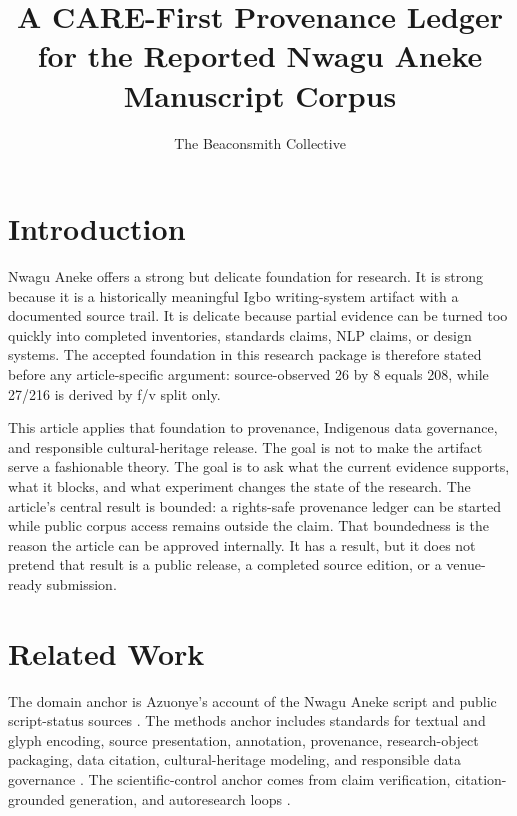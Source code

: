 \documentclass[sigconf,nonacm]{acmart}
\title{A CARE-First Provenance Ledger for the Reported Nwagu Aneke Manuscript Corpus}
\author{The Beaconsmith Collective}
\affiliation{\institution{Etisiobi Research Studio}\city{Enugu}\country{Nigeria}}
\begin{document}
\maketitle

\section{Introduction}
Nwagu Aneke offers a strong but delicate foundation for research. It is strong
because it is a historically meaningful Igbo writing-system artifact with a
documented source trail. It is delicate because partial evidence can be turned
too quickly into completed inventories, standards claims, NLP claims, or design
systems. The accepted foundation in this research package is therefore stated
before any article-specific argument: source-observed 26 by 8 equals 208, while
27/216 is derived by f/v split only.

This article applies that foundation to provenance, Indigenous data governance, and responsible cultural-heritage release. The goal is not to make the
artifact serve a fashionable theory. The goal is to ask what the current
evidence supports, what it blocks, and what experiment changes the state of the
research. The article's central result is bounded: a rights-safe provenance ledger can be started while public corpus access remains outside the claim. That boundedness is
the reason the article can be approved internally. It has a result, but it does
not pretend that result is a public release, a completed source edition, or a
venue-ready submission.

\section{Related Work}
The domain anchor is Azuonye's account of the Nwagu Aneke script and public
script-status sources \cite{azuonye1992,omniglotNwagu,unicodeAfricanScripts2023,scriptSourceNwagu,sirisNwaguProposal}.
The methods anchor includes standards for textual and glyph encoding, source
presentation, annotation, provenance, research-object packaging, data citation,
cultural-heritage modeling, and responsible data governance \cite{azuonye1992,omniglotNwagu,unicodeAfricanScripts2023,scriptSourceNwagu,sirisNwaguProposal,teiP5Glyphs,iiifPresentation3,w3cAnnotationModel,w3cAnnotationVocab,w3cProvO,rocrate12,cidocCrm,datacite45,wilkinson2016fair,carroll2020care,wadden2020scifact,gao2023alce,karpathyAutoresearch,acmSubmissions,arxivSubmitTex}.
The scientific-control anchor comes from claim verification, citation-grounded
generation, and autoresearch loops \cite{wadden2020scifact,gao2023alce,karpathyAutoresearch}.
\end{document}
